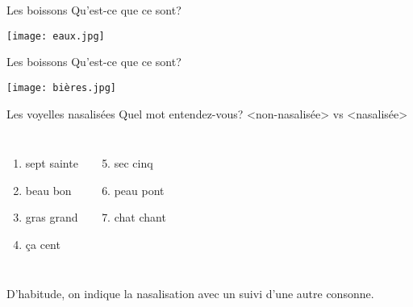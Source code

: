 \documentclass{beamer}
\begin{document}
  \begin{frame}{Les boissons}
    Qu'est-ce que ce sont? \underline{}
    \begin{center}
      \texttt{[image: eaux.jpg]}
    \end{center}
  \end{frame}

  \begin{frame}{Les boissons}
    Qu'est-ce que ce sont? \underline{}
    \begin{center}
      \texttt{[image: bières.jpg]}
    \end{center}
  \end{frame}

  \begin{frame}{Les voyelles nasalisées}
    Quel mot entendez-vous? <non-nasalisée> vs <nasalisée>
    \begin{columns}[t]
        \begin{enumerate}
          \item sept sainte
          \item beau bon
          \item gras grand
          \item ça cent
        \end{enumerate}
        \begin{enumerate}
          \setcounter{enumi}{4}
          \item sec cinq
          \item peau pont
          \item chat chant
        \end{enumerate}
    \end{columns}
    \vspace{0.5cm}
    D'habitude, on indique la nasalisation avec un  suivi d'une autre consonne. \\
  \end{frame}
\end{document}
